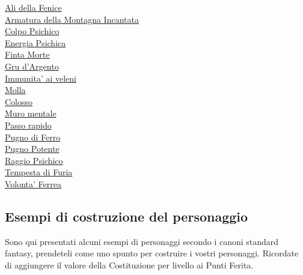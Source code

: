 \begin{multicols}{3}
{\begin{flushleft}
\hyperlink{Ali della Fenice}{Ali della Fenice}\\
\hyperlink{Armatura della Montagna Incantata}{Armatura della Montagna Incantata}\\
\hyperlink{Colpo Psichico}{Colpo Psichico}\\
\hyperlink{Energia Psichica}{Energia Psichica}\\
\hyperlink{Finta Morte}{Finta Morte}\\
\hyperlink{Gru d'Argento}{Gru d'Argento}\\
\hyperlink{Immunita' ai veleni}{Immunita' ai veleni}\\
\hyperlink{Molla}{Molla}\\
\hyperlink{Colosso}{Colosso}\\
\hyperlink{Muro mentale}{Muro mentale}\\
\hyperlink{Passo rapido}{Passo rapido}\\
\hyperlink{Pugno di Ferro}{Pugno di Ferro}\\
\hyperlink{Pugno Potente}{Pugno Potente}\\
\hyperlink{Raggio Psichico}{Raggio Psichico}\\
\hyperlink{Tempesta di Furia}{Tempesta di Furia}\\
\hyperlink{Volonta' Ferrea}{Volonta' Ferrea}

\end{flushleft}
}

\end{multicols}

\subsection{Esempi di costruzione del personaggio}

Sono qui presentati alcuni esempi di personaggi secondo i canoni standard fantasy, prendeteli come uno spunto per costruire i vostri personaggi. Ricordate di aggiungere il valore della Costituzione per livello ai Punti Ferita.

